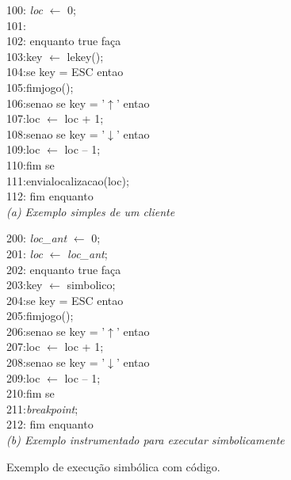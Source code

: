 \begin{figure}[h!]
		\small
		\begin{multicols}{2}

		100: \textit{loc} $\leftarrow$ 0; \\
		101: \\
		102: enquanto true faça \\
		103:\tab    key $\leftarrow$ lekey(); \\
		104:\tab	se key = ESC entao \\
		105:\tab\tab		fimjogo(); \\
		106:\tab	senao se key = '$\uparrow$' entao \\
		107:\tab\tab		loc $\leftarrow$  loc + 1; \\
		108:\tab	senao se key = '$\downarrow$' entao \\
		109:\tab\tab		loc $\leftarrow$  loc -- 1; \\
		110:\tab	fim se \\
		111:\tab envialocalizacao(loc); \\
		112: fim enquanto \\

		\footnotesize
		\textit{(a) Exemplo simples de um cliente}

		\small
		200: \textit{loc\_ant} $\leftarrow$ 0; \\
		201: \textit{loc} $\leftarrow$ \textit{loc\_ant}; \\
		202: enquanto true faça \\
		203:\tab	key $\leftarrow$ simbolico; \\
		204:\tab	se key = ESC entao \\
		205:\tab\tab		fimjogo(); \\
		206:\tab	senao se key = '$\uparrow$' entao \\
		207:\tab\tab		loc $\leftarrow$  loc + 1; \\
		208:\tab	senao se key = '$\downarrow$' entao \\
		209:\tab\tab		loc $\leftarrow$  loc -- 1; \\
		210:\tab	fim se \\
		211:\tab	\textit{breakpoint}; \\
		212: fim enquanto \\ 

		\footnotesize
		\textit{(b) Exemplo instrumentado para executar simbolicamente}

		\end{multicols}

	\caption[Exemplo de execução simbólica com código.]{Exemplo de execução simbólica com código.}
	\label{fig:codigo1}	

\end{figure}


